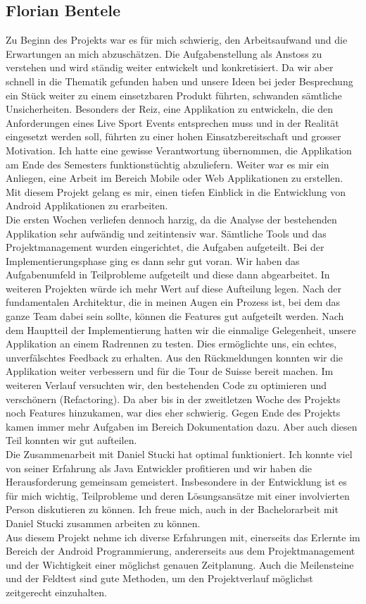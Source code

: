 \subsection{Florian Bentele}
Zu Beginn des Projekts war es für mich schwierig, den Arbeitsaufwand und die Erwartungen an mich abzuschätzen. Die Aufgabenstellung als Anstoss zu verstehen und wird ständig weiter entwickelt und konkretisiert. Da wir aber schnell in die Thematik gefunden haben und unsere Ideen bei jeder Besprechung ein Stück weiter zu einem einsetzbaren Produkt führten, schwanden sämtliche Unsicherheiten. Besonders der Reiz, eine Applikation zu entwickeln, die den Anforderungen eines Live Sport Events entsprechen muss und in der Realität eingesetzt werden soll, führten zu einer hohen Einsatzbereitschaft und grosser Motivation. Ich hatte eine gewisse Verantwortung übernommen, die Applikation am Ende des Semesters funktionstüchtig abzuliefern. Weiter war es mir ein Anliegen, eine Arbeit im Bereich Mobile oder Web Applikationen zu erstellen. Mit diesem Projekt gelang es mir, einen tiefen Einblick in die Entwicklung von Android Applikationen zu erarbeiten.
\\
Die ersten Wochen verliefen dennoch harzig, da die Analyse der bestehenden Applikation sehr aufwändig und zeitintensiv war. Sämtliche Tools und das Projektmanagement wurden eingerichtet, die Aufgaben aufgeteilt. Bei der Implementierungsphase ging es dann sehr gut voran. Wir haben das Aufgabenumfeld in Teilprobleme aufgeteilt und diese dann abgearbeitet. In weiteren Projekten würde ich mehr Wert auf diese Aufteilung legen. Nach der fundamentalen Architektur, die in meinen Augen ein Prozess ist, bei dem das ganze Team dabei sein sollte, können die Features gut aufgeteilt werden. Nach dem Hauptteil der Implementierung hatten wir die einmalige Gelegenheit, unsere Applikation an einem Radrennen zu testen. Dies ermöglichte uns, ein echtes, unverfälschtes Feedback zu erhalten. Aus den Rückmeldungen konnten wir die Applikation weiter verbessern und für die Tour de Suisse bereit machen.  Im weiteren Verlauf versuchten wir, den bestehenden Code zu optimieren und verschönern (Refactoring). Da aber bis in der zweitletzen Woche des Projekts noch Features hinzukamen, war dies eher schwierig. Gegen Ende des Projekts kamen immer mehr Aufgaben im Bereich Dokumentation dazu. Aber auch diesen Teil konnten wir gut aufteilen.
\\
Die Zusammenarbeit mit Daniel Stucki hat optimal funktioniert. Ich konnte viel von seiner Erfahrung als Java Entwickler profitieren und wir haben die Herausforderung gemeinsam gemeistert. Insbesondere in der Entwicklung ist es für mich wichtig, Teilprobleme und deren Lösungsansätze mit einer involvierten Person diskutieren zu können. Ich freue mich, auch in der Bachelorarbeit mit Daniel Stucki zusammen arbeiten zu können.
\\
Aus diesem Projekt nehme ich diverse Erfahrungen mit, einerseits das Erlernte im Bereich der Android Programmierung, andererseits aus dem Projektmanagement und der Wichtigkeit einer möglichst genauen Zeitplanung. Auch die Meilensteine und der Feldtest sind gute Methoden, um den Projektverlauf möglichst zeitgerecht einzuhalten.

